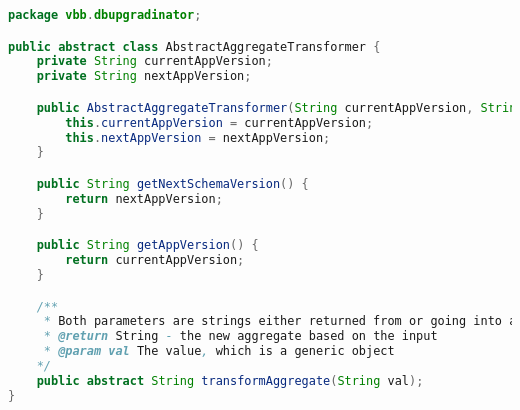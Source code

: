 \begin{lstlisting}[language=Java, caption={Klassen \emph{AbstractAggregateTransformer}, hvis hovedansvar er å lage en ny streng ut fra et gitt strengargument i funksjonen \emph{transformAggregate}, som programvareutvikleren selv må implementere.}]
package vbb.dbupgradinator;

public abstract class AbstractAggregateTransformer {
    private String currentAppVersion;
    private String nextAppVersion;

    public AbstractAggregateTransformer(String currentAppVersion, String nextAppVersion) {
        this.currentAppVersion = currentAppVersion;
        this.nextAppVersion = nextAppVersion;
    }

    public String getNextSchemaVersion() {
        return nextAppVersion;
    }

    public String getAppVersion() {
        return currentAppVersion;
    }

    /**
     * Both parameters are strings either returned from or going into a DB query
     * @return String - the new aggregate based on the input
     * @param val The value, which is a generic object
    */
    public abstract String transformAggregate(String val);
}
\end{lstlisting}
